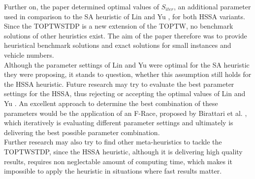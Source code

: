 \documentclass[final,5p,times,twocolumn]{elsarticle}
\begin{document}
{{{{{{{{{{{{{Further on, the paper determined optimal values of $S_{iter}$, an additional parameter used in comparison to the SA heuristic of Lin and Yu \cite{Lin:2012sa}, for both HSSA variants. \\
Since the TOPTWSTDP is a new extension of the TOPTW, no benchmark solutions of other heuristics exist. The aim of the paper therefore was to provide heuristical benchmark solutions and exact solutions for small instances and vehicle numbers. \\
Although the parameter settings of Lin and Yu \cite{Lin:2012sa} were optimal for the SA heuristic they were proposing, it stands to question, whether this assumption still holds for the HSSA heuristic. Future research may try to evaluate the best parameter settings for the HSSA, thus rejecting or accepting the optimal values of Lin and Yu     \cite{Lin:2012sa}. An excellent approach to determine the best combination of these parameters would be the application of an F-Race, proposed by Birattari et al. \cite{Birattari:2010frace}, which iteratively is evaluating different parameter settings and ultimately is delivering the best possible parameter combination. \\
Further research may also try to find other meta-heuristics to tackle the TOPTWSTDP, since the HSSA heuristic, although it is delivering high quality results, requires non neglectable amount of computing time, which makes it impossible to apply the heuristic in situations where fast results matter. 

%




}}}}}}}}}}}}}
\end{document}
